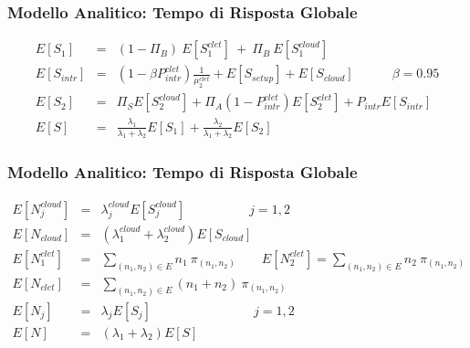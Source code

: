 \begin{frame}
\frametitle{Modello Analitico: Tempo di Risposta Globale}

\setlength\arraycolsep{2pt}
\begin{eqnarray*}
E[S_1] &=& (1-\Pi_B) \ E[S_1^{clet}] \ + \ \Pi_B \ E[S_1^{cloud}] \\[20pt]
E[S_{intr}] &=& 
(1 - \beta P_{intr}^{clet}) \frac{1}{\mu_2^{clet}} + E[S_{setup}] + E[S_{cloud}]
\qquad\quad \beta = 0.95 \\[20pt]
E[S_2] &=& 
\Pi_S E[S_2^{cloud}] + \Pi_A (1-P_{intr}^{clet}) E[S_2^{clet}] + 
P_{intr} E[S_{intr}] \\[20pt]
E[S] & = &
\frac{\lambda_1}{\lambda_1+\lambda_2}  E[S_1] +
\frac{\lambda_2}{\lambda_1+\lambda_2}  E[S_2] 
\end{eqnarray*}

\end{frame}
\begin{frame}
\frametitle{Modello Analitico: Tempo di Risposta Globale}

\setlength\arraycolsep{2pt}
\begin{eqnarray*}
E[N_j^{cloud}] &=& \lambda_j^{cloud} E[S_j^{cloud}]  \qquad\quad\qquad j=1,2 \\
E[N_{cloud}] &=& (\lambda_1^{cloud} + \lambda_2^{cloud}) E[S_{cloud}] \\[15pt]
E[N_1^{clet}] &=& \sum_{(n_1,n_2) \in E} n_1 \ \pi_{(n_1,n_2)} \qquad
E[N_2^{clet}] = \sum_{(n_1,n_2) \in E} n_2 \ \pi_{(n_1,n_2)} \\
E[N_{clet}] &=& \sum_{(n_1,n_2) \in E} (n_1+n_2) \ \pi_{(n_1,n_2)} \\[15pt]
E[N_j] &=& \lambda_j E[S_j]  \qquad\quad\qquad\quad\qquad j=1,2 \\
E[N] &=& (\lambda_1 + \lambda_2) E[S]
\end{eqnarray*}

\end{frame}
